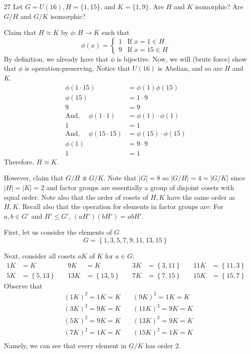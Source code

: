 \begin{hwproblem}
{27}{
    Let $G=U(16), H=\{1,15\}$, and $K=\{1,9\}$. Are $H$ and $K$ isomorphic? Are $G / H$ and $G / K$ isomorphic?
}

Claim that \(H \approx K\) by \(\phi : H \to K\) such that
\[
    \phi(x) = \begin{cases}
        1 & \text{If } x = 1 \in H \\
        9 & \text{If } x = 15 \in H
    \end{cases}
\]
By definition, we already have that \(\phi\) is bijective. Now, we will (brute force) show that \(\phi\) is operation-preserving. Notice that \(U(16)\) is Abelian, and so are \(H\) and \(K\).
\[
\begin{aligned}
    \phi(1 \cdot 15) &= \phi(1) \phi(15) \\
    \phi(15) &= 1 \cdot 9 \\
    9 &= 9\\
    \text{And, } \quad \phi(1 \cdot 1) &= \phi(1) \cdot \phi(1) \\
        1 &= 1\\
    \text{And, } \quad \phi(15 \cdot 15) &= \phi(15) \cdot \phi(15) \\
        \phi(1) &= 9 \cdot 9 \\
        1 &= 1
\end{aligned}
\]
Therefore, \(H \approx K\).

However, claim that \(G/H \napprox G/K\). Note that \(|G| = 8\) so \(|G/H| = 4 = |G/K|\) since \(|H| = |K| = 2\) and factor groups are essentially a group of disjoint cosets with equal order. Note also that the order of cosets of \(H, K\) have the same order as \(H, K\). Recall also that the operation for elements in factor groups are: For \(a, b \in G'\) and \(H' \leq G'\), \((aH')(bH') = abH'\).

First, let us consider the elements of \(G\)
\[
    G = \left\{1, 3, 5, 7, 9, 11, 13, 15\right\}
\]

Next, consider all cosets \(aK\) of \(K\) for \(a \in G\):
\[
\begin{aligned}
    1K &= K                     &\quad 9K &= K 
       &\quad 3K &= \left\{3, 11\right\}  &\quad 11K &= \left\{11, 3\right\} \\
    5K &= \left\{5, 13\right\}  &\quad 13K &= \left\{13, 5\right\} 
       &\quad 7K &= \left\{7, 15\right\}  &\quad 15K &= \left\{15, 7\right\}
\end{aligned}
\]
Observe that
\[
\begin{aligned}
    &(1K)^2 = 1K = K \quad &(9K)^2 = 1K = K \\
    &(3K)^2 = 9K = K \quad &(11K)^2 = 9K = K \\
    &(5K)^2 = 9K = K \quad &(13K)^2 = 9K = K \\
    &(7K)^2 = 1K = K \quad &(15K)^2 = 1K = K \\
\end{aligned}
\]
Namely, we can see that every element in \(G/K\) has order 2.


\end{hwproblem}
